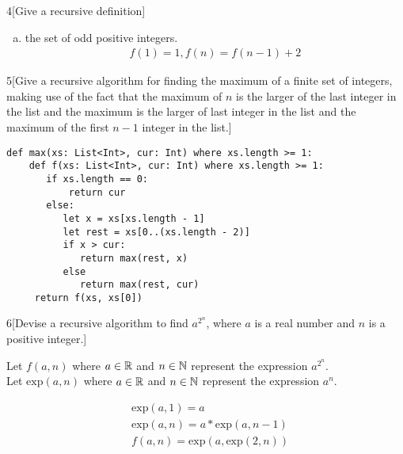 \documentclass{homework}
\begin{document}

\begin{problem}{4}[Give a recursive definition]


\begin{enumerate}[(a)]

\item the set of odd positive integers. \\
\begin{align*}
f(1) = 1, f(n) = f(n - 1) + 2
\end{align*}

\end{enumerate}
\end{problem}



\begin{problem}{5}[Give a recursive algorithm for finding the maximum of a finite set of integers, making use of the fact that the maximum of $n$ is the larger of the last integer in the list and the maximum is the larger of last integer in the list and the maximum of the first $n-1$ integer in the list.]

\begin{lstlisting}
def max(xs: List<Int>, cur: Int) where xs.length >= 1:
    def f(xs: List<Int>, cur: Int) where xs.length >= 1:
       if xs.length == 0:
           return cur
       else:
          let x = xs[xs.length - 1]
          let rest = xs[0..(xs.length - 2)]
          if x > cur:
             return max(rest, x)
          else
             return max(rest, cur)
     return f(xs, xs[0])
\end{lstlisting}
\end{problem}



\begin{problem}{6}[Devise a recursive algorithm to find $a^{2^n}$, where $a$ is a real number and $n$ is a positive integer.]

Let $f(a, n)$ where $a \in \mathbb{R}$ and $n \in \mathbb{N}$ represent the expression $a^{2^n}$. \\
Let $\text{exp}(a, n)$ where $a \in \mathbb{R}$ and $n \in \mathbb{N}$ represent the expression $a^n$.

\begin{align*}
& \text{exp}(a, 1) = a \\
& \text{exp}(a, n) = a * \text{exp}(a, n - 1) \\
& f(a, n) = \text{exp}(a, \text{exp}(2, n))
\end{align*}
\end{problem}
\end{document}

